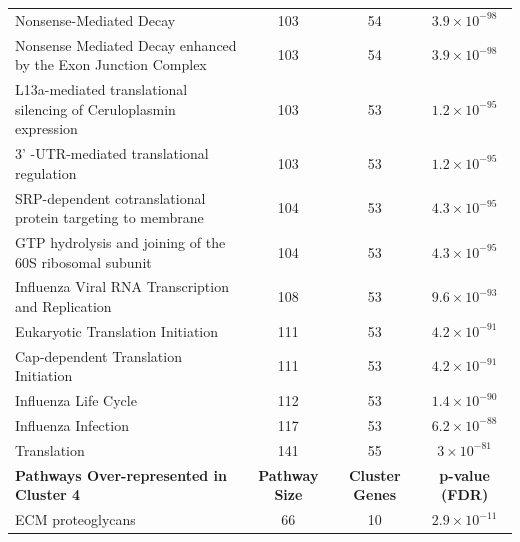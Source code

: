 \begin{table}[!hp]
{\begin{threeparttable}
\begin{tabular}{lccc}
  \rowcolor{Cluster_Orange!30} 
  Nonsense-Mediated Decay & 103 &  54 & $3.9 \times 10^{-98}$ \\ 
  \rowcolor{Cluster_Orange!20} 
  Nonsense Mediated Decay enhanced by the Exon Junction Complex & 103 &  54 & $3.9 \times 10^{-98}$ \\ 
  \rowcolor{Cluster_Orange!30} 
  L13a-mediated translational silencing of Ceruloplasmin expression & 103 &  53 & $1.2 \times 10^{-95}$ \\ 
  \rowcolor{Cluster_Orange!20} 
  3' -UTR-mediated translational regulation & 103 &  53 & $1.2 \times 10^{-95}$ \\ 
  \rowcolor{Cluster_Orange!30} 
  SRP-dependent cotranslational protein targeting to membrane & 104 &  53 & $4.3 \times 10^{-95}$ \\ 
  \rowcolor{Cluster_Orange!20} 
  GTP hydrolysis and joining of the 60S ribosomal subunit & 104 &  53 & $4.3 \times 10^{-95}$ \\ 
  \rowcolor{Cluster_Orange!30} 
  Influenza Viral \acrshort{RNA} Transcription and Replication & 108 &  53 & $9.6 \times 10^{-93}$ \\ 
  \rowcolor{Cluster_Orange!20} 
  Eukaryotic Translation Initiation & 111 &  53 & $4.2 \times 10^{-91}$ \\ 
  \rowcolor{Cluster_Orange!30} 
  Cap-dependent Translation Initiation & 111 &  53 & $4.2 \times 10^{-91}$ \\ 
  \rowcolor{Cluster_Orange!20} 
  Influenza Life Cycle & 112 &  53 & $1.4 \times 10^{-90}$ \\ 
  \rowcolor{Cluster_Orange!30} 
  Influenza Infection & 117 &  53 & $6.2 \times 10^{-88}$ \\ 
  \rowcolor{Cluster_Orange!20} 
  Translation & 141 &  55 & $3 \times 10^{-81}$ \\ 
  \hline
  \cellcolor{white} \large{\textbf{Pathways Over-represented in Cluster 4}} & \large{\textbf{Pathway Size}} & \large{\textbf{Cluster Genes}} & \large{\textbf{p-value (\gls{FDR})}} \\ %
  \hline 
  \rowcolor{Cluster_Red!20}
  ECM proteoglycans &  66 &  10 & $2.9 \times 10^{-11}$ \\ 

\end{tabular}
\end{threeparttable}}
\end{table}
